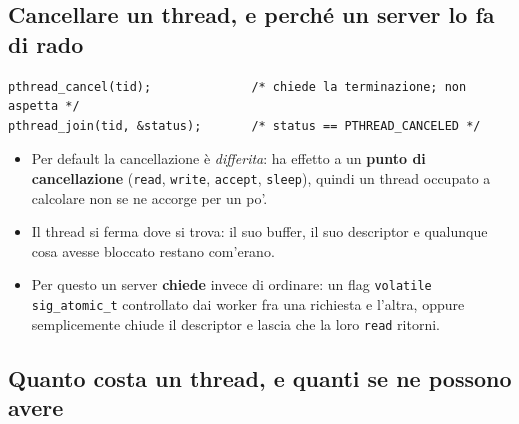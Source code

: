 
\subsection{Cancellare un thread, e perché un server lo fa di rado}

\begin{lstlisting}[language={[POSIX]C}]
pthread_cancel(tid);              /* chiede la terminazione; non aspetta */
pthread_join(tid, &status);       /* status == PTHREAD_CANCELED */
\end{lstlisting}

\begin{itemize}
    \item Per default la cancellazione è \emph{differita}: ha effetto a un \textbf{punto di cancellazione} (\texttt{read},
          \texttt{write}, \texttt{accept}, \texttt{sleep}), quindi un thread occupato a calcolare non se ne accorge per un
          po'.
    \item Il thread si ferma dove si trova: il suo buffer, il suo descriptor e qualunque cosa avesse bloccato restano com'erano.
    \item Per questo un server \textbf{chiede} invece di ordinare: un flag \texttt{volatile sig\_atomic\_t} controllato dai
          worker fra una richiesta e l'altra, oppure semplicemente chiude il descriptor e lascia che la loro \texttt{read}
          ritorni.
\end{itemize}

\subsection{Quanto costa un thread, e quanti se ne possono avere}


